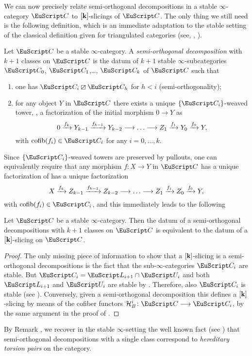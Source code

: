  
We can now precisely relate semi-orthogonal decompositions in a stable $\infty$-category $\C$ to $[\mathbf{k}]$-slicings of $\C$. The only thing we still need is the following definition, which is an immediate adaptation to the stable setting of the classical definition given for triangulated categories (see, \eg, \cite{Bondal1995, Kuz} ).
\begin{definition}
Let $\C$ be a stable $\infty$-category. A \emph{semi-orthogonal decomposition} with $k+1$ classes on $\C$ is the datum of $k+1$ stable $\infty$-subcategories $\C_0$, $\C_1$,\dots, $\C_{k}$ of $\C$ such that
\begin{enumerate}
\item one has $\C_i\orth \C_h$ for $h<i$ (semi-orthogonality);
\item for any object $Y$ in $\C$ there exists a unique $\{\C_i\}$-weaved tower, \ie, a factorization of the initial morphism $0\to Y$ as 
\[
0 \xto{f_{k}} Y_{k-1} \xto{f_{k-1}}Y_{{k-2}}\to\dots\to Z_{{1}} \xto{f_1} Y_{0} \xto{f_0} Y,
\]
with $\cofib(f_i)\in \C_i$ for any $i=0,\dots, k$. 
\end{enumerate} 
\end{definition}
Since $\{\C_i\}$-weaved towers are preserved by pullouts, one can equivalently require that any morphism $f\colon X\to Y$ in $\C$ has a unique factorization of has a unique factorization
\[
X \xto{f_{k}} Z_{k-1} \xto{f_{k-1}}Z_{{k-2}}\to\dots\to Z_{{1}} \xto{f_1} Z_{0} \xto{f_0} Y,
\]
with $\cofib(f_i)\in \C_i$, and this immediately leads to the following 
\begin{proposition}\label{what.s.semiortho}
Let $\C$ be a stable $\infty$-category. Then the datum of a semi-orthogonal decompositions with $k+1$ classes on $\C$ is equivalent to the datum of a $[\mathbf{k}]$-slicing on $\C$.
\end{proposition}
\begin{proof}
The only missing piece of information to show that a $[\mathbf{k}]$-slicing is a semi-orthogonal decompositions is the fact that the sub-$\infty$-categories $\C_i$ are stable. But $\C_i=\cate{L}_{i+1}\cap \cate{U}_i$ and both $\cate{L}_{i+1}$ and $\cate{U}_i$ are stable by \aprop{}. Therefore, also $\C_i$ is stable (see \cite{LurieHA}).  Conversely, given a semi-orthogonal decomposition this defines a $[\mathbf{k}]$-slicing by means of the cofiber functors $\mathcal{H}^i_B\colon \C\to \C_i$, by the same argument in the proof of \aprop{}. 
\end{proof}
\begin{remark}By Remark , we recover in the stable $\infty$-setting the well known fact (see \cite[\textbf{IV.4}]{Beligiannisreiten}) that semi-orthogonal decompositions with a single class correspond to \emph{hereditary torsion pairs} on the category.
\end{remark}
